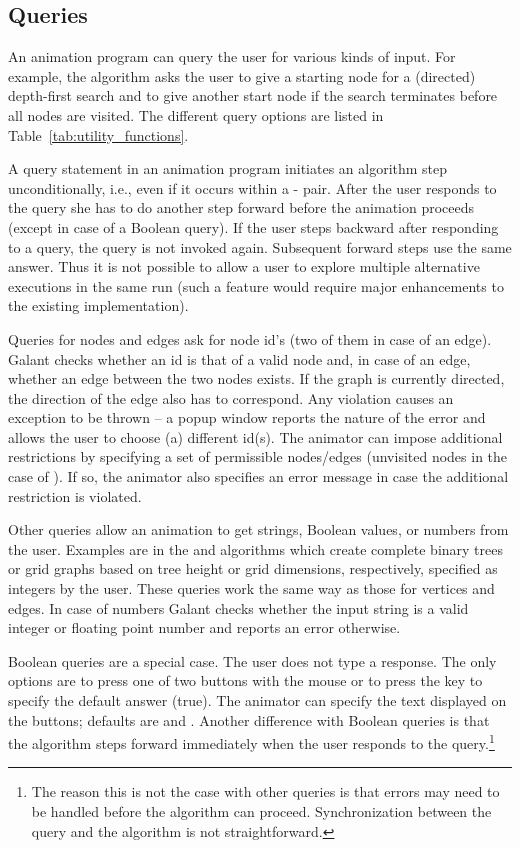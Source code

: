 \subsection{Queries}

An animation program can query the user for various kinds of input.
For example, the  algorithm asks the user to give a
starting node for a (directed) depth-first search and to give another start
node if the search terminates before all nodes are visited. The different
query options are listed in Table~\ref{tab:utility_functions}.

A query statement in an animation program initiates an algorithm step
unconditionally, i.e., even if it occurs within a
- pair.
After the user responds to the query she has to do another step forward
before the animation proceeds (except in case of a Boolean query).
If the user steps backward after responding to a query, the query is not
invoked again. Subsequent forward steps use the same answer.
Thus it is not possible to allow a user to explore multiple alternative
executions in the same run (such a feature would require major enhancements
to the existing implementation).

Queries for nodes and edges ask for node id's (two of them in case of an
edge). Galant checks whether an id is that of a valid node and, in case of an
edge, whether an edge between the two nodes exists. If the graph is currently
directed, the direction of the edge also has to correspond. Any violation
causes an exception to be thrown -- a popup window reports the nature of the
error and allows the user to choose (a) different id(s).
The animator can impose additional restrictions by specifying a set of
permissible nodes/edges (unvisited nodes in the case of
). If so, the animator also specifies an error message
in case the additional restriction is violated.

Other queries allow an animation to get strings, Boolean values, or numbers
from the user. Examples are in the  and 
algorithms which create complete binary trees or grid graphs based on tree
height or grid dimensions, respectively, specified as integers by the user.
These queries work the same way as those for vertices and edges. In case of
numbers Galant checks whether the input string is a valid integer or
floating point number and reports an error otherwise.

Boolean queries are a special case. The user does not type a response. The
only options are to press one of two buttons with the mouse or to press the
 key to specify the default answer (true).
The animator can specify the text displayed on the buttons; defaults are
 and .
Another difference with Boolean queries is that the algorithm steps forward
immediately when the user responds to the query.\footnote{The reason this is
  not the case with other queries is that errors may need to be handled
  before the algorithm can proceed. Synchronization between the query and the
  algorithm is not straightforward.}

